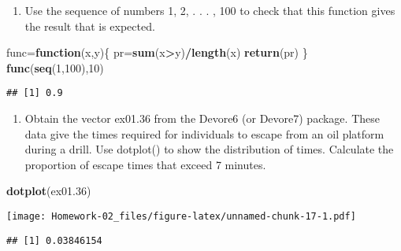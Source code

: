 \documentclass[
]{article}
\newenvironment{Shaded}{\begin{snugshade}}{\end{snugshade}}
\newcommand{\ControlFlowTok}[1]{\textcolor[rgb]{0.13,0.29,0.53}{\textbf{#1}}}
\newcommand{\DecValTok}[1]{\textcolor[rgb]{0.00,0.00,0.81}{#1}}
\newcommand{\FloatTok}[1]{\textcolor[rgb]{0.00,0.00,0.81}{#1}}
\newcommand{\KeywordTok}[1]{\textcolor[rgb]{0.13,0.29,0.53}{\textbf{#1}}}
\newcommand{\NormalTok}[1]{#1}
\newcommand{\OperatorTok}[1]{\textcolor[rgb]{0.81,0.36,0.00}{\textbf{#1}}}
\providecommand{\tightlist}{%
  \setlength{\itemsep}{0pt}\setlength{\parskip}{0pt}}
\begin{document}
\begin{enumerate}
\def\labelenumi{(\alph{enumi})}
\tightlist
\item
  Use the sequence of numbers 1, 2, . . . , 100 to check that this
  function gives the result that is expected.
\end{enumerate}

\begin{Shaded}
\begin{Highlighting}[]
\NormalTok{func=}\ControlFlowTok{function}\NormalTok{(x,y)\{}
\NormalTok{  pr=}\KeywordTok{sum}\NormalTok{(x}\OperatorTok{>}\NormalTok{y)}\OperatorTok{/}\KeywordTok{length}\NormalTok{(x)}
  \KeywordTok{return}\NormalTok{(pr)}
\NormalTok{\}}
\KeywordTok{func}\NormalTok{(}\KeywordTok{seq}\NormalTok{(}\DecValTok{1}\NormalTok{,}\DecValTok{100}\NormalTok{),}\DecValTok{10}\NormalTok{)}
\end{Highlighting}
\end{Shaded}

\begin{verbatim}
## [1] 0.9
\end{verbatim}

\begin{enumerate}
\def\labelenumi{(\alph{enumi})}
\setcounter{enumi}{1}
\tightlist
\item
  Obtain the vector ex01.36 from the Devore6 (or Devore7) package. These
  data give the times required for individuals to escape from an oil
  platform during a drill. Use dotplot() to show the distribution of
  times. Calculate the proportion of escape times that exceed 7 minutes.
\end{enumerate}

\begin{Shaded}
\begin{Highlighting}[]
\KeywordTok{dotplot}\NormalTok{(ex01}\FloatTok{.36}\NormalTok{)}
\end{Highlighting}
\end{Shaded}

\texttt{[image: Homework-02\_files/figure-latex/unnamed-chunk-17-1.pdf]}

\begin{Shaded}
\end{Shaded}

\begin{verbatim}
## [1] 0.03846154
\end{verbatim}
\end{document}
